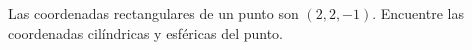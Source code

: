 \item Las coordenadas rectangulares de un punto son $(2, 2, -1)$. Encuentre las coordenadas cilíndricas y esféricas del punto.
